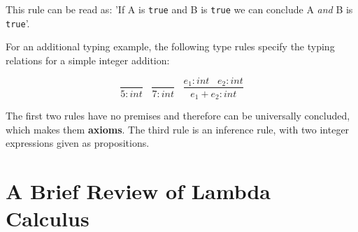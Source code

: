 \documentclass{l4proj}
\begin{document}
This rule can be read as: 'If A is \texttt{true} and B is \texttt{true} we can conclude A \emph{and} B is \texttt{true}'.

For an additional typing example, the following type rules specify the typing relations for a simple integer addition:

\begin{equation} \label{eq:add-type-rule}
\frac{}{5 : int} \;\;\; \frac{}{7 : int} \;\;\; \frac{e_1 : int \;\;\; e_2 : int}{e_1 + e_2 : int}
\end{equation}

The first two rules have no premises and therefore can be universally concluded, which makes them \textbf{axioms}.
The third rule is an inference rule, with two integer expressions given as propositions.










\section{A Brief Review of Lambda Calculus} \label{sec:lambda-review}
\end{document}
